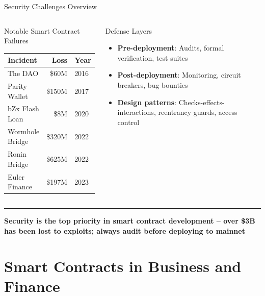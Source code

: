 \documentclass[8pt,aspectratio=169]{beamer}
\newcommand{\bottomnote}[1]{\vfill\vspace{-2mm}\textcolor{mllavender2}{\rule{\textwidth}{0.4pt}}\vspace{1mm}\footnotesize\textbf{#1}}
\begin{document}
\begin{frame}{Security Challenges Overview}
\begin{columns}[T]
\begin{alertblock}{Notable Smart Contract Failures}
\footnotesize
\begin{tabular}{l r l}
\toprule
\textbf{Incident} & \textbf{Loss} & \textbf{Year} \\
\midrule
\rowcolor{mllavender4}
The DAO & \$60M & 2016 \\
Parity Wallet & \$150M & 2017 \\
\rowcolor{mllavender4}
bZx Flash Loan & \$8M & 2020 \\
Wormhole Bridge & \$320M & 2022 \\
\rowcolor{mllavender4}
Ronin Bridge & \$625M & 2022 \\
Euler Finance & \$197M & 2023 \\
\bottomrule
\end{tabular}
\end{alertblock}
\vspace{2mm}
\begin{exampleblock}{Defense Layers}
\footnotesize
\begin{itemize}
  \item \textbf{Pre-deployment}: Audits, formal verification, test suites
  \item \textbf{Post-deployment}: Monitoring, circuit breakers, bug bounties
  \item \textbf{Design patterns}: Checks-effects-interactions, reentrancy guards, access control
\end{itemize}
\end{exampleblock}
\end{columns}
\bottomnote{Security is the top priority in smart contract development -- over \$3B has been lost to exploits; always audit before deploying to mainnet}
\end{frame}

\section{Smart Contracts in Business and Finance}
\end{document}
